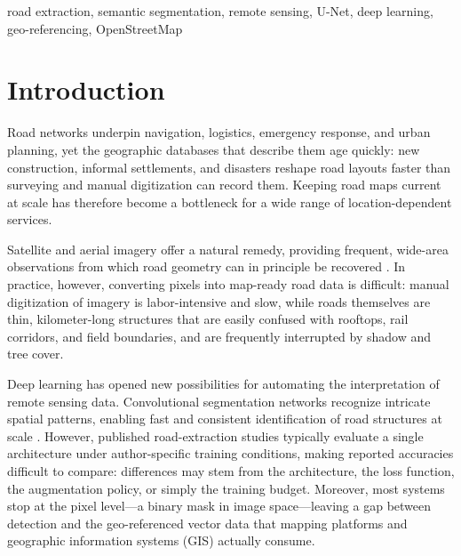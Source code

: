 \documentclass[conference]{IEEEtran}
\begin{document}
\begin{IEEEkeywords}
road extraction, semantic segmentation, remote sensing, U-Net, deep learning,
geo-referencing, OpenStreetMap
\end{IEEEkeywords}

\section{Introduction}
Road networks underpin navigation, logistics, emergency response, and urban
planning, yet the geographic databases that describe them age quickly: new
construction, informal settlements, and disasters reshape road layouts faster
than surveying and manual digitization can record them. Keeping road maps
current at scale has therefore become a bottleneck for a wide range of
location-dependent services.

Satellite and aerial imagery offer a natural remedy, providing frequent,
wide-area observations from which road geometry can in principle be recovered
\cite{cheng2016survey,zhu2017deep}. In practice, however, converting pixels
into map-ready road data is difficult: manual digitization of imagery is
labor-intensive and slow, while roads themselves are thin, kilometer-long
structures that are easily confused with rooftops, rail corridors, and field
boundaries, and are frequently interrupted by shadow and tree cover.

Deep learning has opened new possibilities for automating the interpretation
of remote sensing data. Convolutional segmentation networks recognize intricate
spatial patterns, enabling fast and consistent identification of road
structures at scale \cite{long2015fcn,ronneberger2015unet}. However, published
road-extraction studies typically evaluate a single architecture under
author-specific training conditions, making reported accuracies difficult to
compare: differences may stem from the architecture, the loss function, the
augmentation policy, or simply the training budget. Moreover, most systems stop
at the pixel level---a binary mask in image space---leaving a gap between
detection and the geo-referenced vector data that mapping platforms and
geographic information systems (GIS) actually consume.
\end{document}
